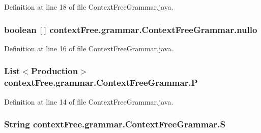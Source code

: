 Definition at line 18 of file Context\-Free\-Grammar.\-java.

\hypertarget{classcontext_free_1_1grammar_1_1_context_free_grammar_a5a9f69817c82b19b21adb85326d60f3b}{
\subsubsection[{nullo}]{\setlength{\rightskip}{0pt plus 5cm}boolean \mbox{[}$\,$\mbox{]} {\bf context\-Free.\-grammar.\-Context\-Free\-Grammar.\-nullo}}}\label{classcontext_free_1_1grammar_1_1_context_free_grammar_a5a9f69817c82b19b21adb85326d60f3b}


Definition at line 16 of file Context\-Free\-Grammar.\-java.

\hypertarget{classcontext_free_1_1grammar_1_1_context_free_grammar_ae1f4363ca57c34622cdca5175aef6b6c}{
\subsubsection[{P}]{\setlength{\rightskip}{0pt plus 5cm}List$<${\bf Production}$>$ {\bf context\-Free.\-grammar.\-Context\-Free\-Grammar.\-P}}}\label{classcontext_free_1_1grammar_1_1_context_free_grammar_ae1f4363ca57c34622cdca5175aef6b6c}


Definition at line 14 of file Context\-Free\-Grammar.\-java.

\hypertarget{classcontext_free_1_1grammar_1_1_context_free_grammar_a516b9fb1183524ea3e7859b41f60ad32}{
\subsubsection[{S}]{\setlength{\rightskip}{0pt plus 5cm}String {\bf context\-Free.\-grammar.\-Context\-Free\-Grammar.\-S}}}\label{classcontext_free_1_1grammar_1_1_context_free_grammar_a516b9fb1183524ea3e7859b41f60ad32}


